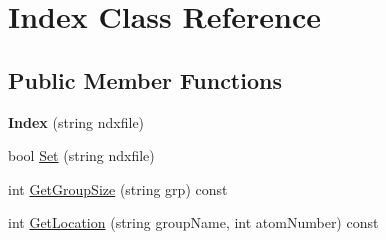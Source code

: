 \hypertarget{classIndex}{\section{Index Class Reference}
\label{classIndex}
}
\subsection*{Public Member Functions}
\begin{DoxyCompactItemize}
\item 
\hypertarget{classIndex_ab469acaa46b7cafcb92917c7d8b93b13}{{\bfseries Index} (string ndxfile)}\label{classIndex_ab469acaa46b7cafcb92917c7d8b93b13}

\item 
bool \hyperlink{classIndex_acb3874ae434461b6bf1fd18b24ee1de0}{Set} (string ndxfile)
\item 
int \hyperlink{classIndex_a1ca0c009e208aba7aad188f0b06f8183}{Get\-Group\-Size} (string grp) const 
\item 
int \hyperlink{classIndex_a217d02daa77ff95e0aa216d7cb42c31a}{Get\-Location} (string group\-Name, int atom\-Number) const 
\end{DoxyCompactItemize}


